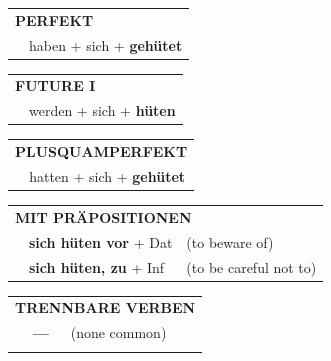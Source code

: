 \documentclass[10pt,a4paper]{revtex4-2}
\begin{document}
\begin{verbbox}
 \begin{tabular}{rl}
     \multicolumn{2}{l}{\textbf{PERFEKT}}\\
   & haben + sich + \textbf{gehütet}\\
  \end{tabular}
\hfill
   \begin{tabular}{rl}
    \multicolumn{2}{l}{\textbf{FUTURE I} }\\
   & werden + sich + \textbf{hüten}\\
  \end{tabular}
\hfill
   \begin{tabular}{rl}
      \multicolumn{2}{l}{\textbf{PLUSQUAMPERFEKT}}\\
   & hatten + sich + \textbf{gehütet}\\
  \end{tabular}

   \vspace{10pt}

   \begin{tabular}{lll}
      \multicolumn{3}{l}{\textbf{MIT PRÄPOSITIONEN}}\\
& \textbf{sich hüten vor} + Dat & (to beware of)\\
& \textbf{sich hüten, zu} + Inf & (to be careful not to)\\
\end{tabular}
  \hfill
   \begin{tabular}{lll}
      \multicolumn{3}{l}{\textbf{TRENNBARE VERBEN}}\\
 & \textbf{---} & (none common)\\
\vspace{10pt}
  \end{tabular}

  \vspace{-5pt}

\end{verbbox}
\end{document}
